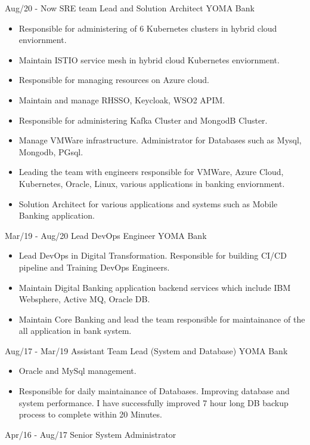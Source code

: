 \documentclass[]{friggeri-cv}
\begin{document}
\begin{entrylist}
  \entry
    {Aug/20 - Now}
    {SRE team Lead and Solution Architect}
    {YOMA Bank}
    { \begin{itemize}
      \item Responsible for administering of 6 Kubernetes clusters in hybrid cloud enviornment.
      \item Maintain ISTIO service mesh in hybrid cloud Kubernetes enviornment.
      \item Responsible for managing resources on Azure cloud.
      \item Maintain and manage RHSSO, Keycloak, WSO2 APIM.
      \item Responsible for administering Kafka Cluster and MongodB Cluster.
      \item Manage VMWare infrastructure. Administrator for Databases such as Mysql, Mongodb, PGsql.
      \item Leading the team with engineers responsible for VMWare, Azure Cloud, Kubernetes, Oracle, Linux, various applications in banking enviornment.
      \item Solution Architect for various applications and systems such as Mobile Banking application.
      \end{itemize}
    }
  \entry
    {Mar/19 - Aug/20}
    {Lead DevOps Engineer}
    {YOMA Bank}
    { \begin{itemize}
        \item Lead DevOps in Digital Transformation. Responsible for building CI/CD pipeline and Training DevOps Engineers.
        \item Maintain Digital Banking application backend services which include IBM Websphere, Active MQ, Oracle DB.
        \item Maintain Core Banking and lead the team responsible for maintainance of the all application in bank system.
      \end{itemize}
    }
  \entry
    {Aug/17 - Mar/19}
    {Assistant Team Lead (System and Database)}
    {YOMA Bank}
    {
      \begin{itemize}
        \item Oracle and MySql management.
        \item Responsible for daily maintainance of Databases. Improving database and system performance. I have successfully improved 7 hour long DB backup process to complete within 20 Minutes.
      \end{itemize}
    }
  \entry
    {Apr/16 - Aug/17}
    {Senior System Administrator}

\end{entrylist}
\end{document}
